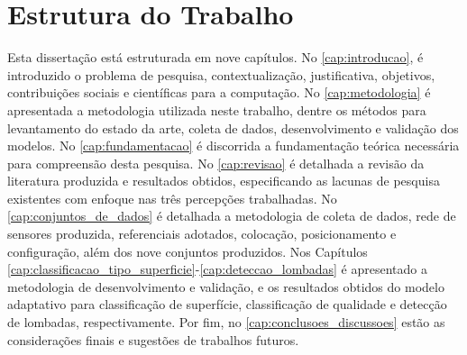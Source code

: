 \section{Estrutura do Trabalho}

Esta dissertação está estruturada em nove capítulos. No \autoref{cap:introducao}, é introduzido o problema de pesquisa, contextualização, justificativa, objetivos, contribuições sociais e científicas para a computação. No \autoref{cap:metodologia} é apresentada a metodologia utilizada neste trabalho, dentre os métodos para levantamento do estado da arte, coleta de dados, desenvolvimento e validação dos modelos. No \autoref{cap:fundamentacao} é discorrida a fundamentação teórica necessária para compreensão desta pesquisa. No \autoref{cap:revisao} é detalhada a revisão da literatura produzida e resultados obtidos, especificando as lacunas de pesquisa existentes com enfoque nas três percepções trabalhadas. No \autoref{cap:conjuntos_de_dados} é detalhada a metodologia de coleta de dados, rede de sensores produzida, referenciais adotados, colocação, posicionamento e configuração, além dos nove conjuntos produzidos. Nos Capítulos \ref{cap:classificacao_tipo_superficie}-\ref{cap:deteccao_lombadas} é apresentado a metodologia de desenvolvimento e validação, e os resultados obtidos do modelo adaptativo para classificação de superfície, classificação de qualidade e detecção de lombadas, respectivamente. Por fim, no \autoref{cap:conclusoes_discussoes} estão as considerações finais e sugestões de trabalhos futuros.
